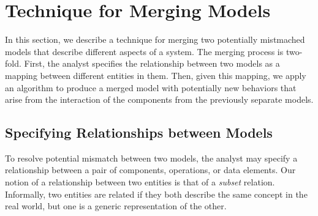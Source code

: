 
\section{Technique for Merging Models}
\label{sec-merging}

In this section, we describe a technique for merging two potentially
mistmached models that describe different aspects of a system. The
merging process is two-fold. First, the analyst specifies the
relationship between two models as a mapping between different
entities in them. Then, given this mapping, we apply an algorithm to
produce a merged model with potentially new behaviors that arise
from the interaction of the components from the previously separate
models.

\subsection{Specifying Relationships between Models}
\label{sec-relationship}

To resolve potential mismatch between two models, the analyst may
specify a relationship between a pair of components, operations, or data
elements. Our notion of a relationship between two entities is that of
a \textit{subset} relation. Informally, two entities are related if
they both describe the same concept in the real world, but one is a
generic representation of the other. 

